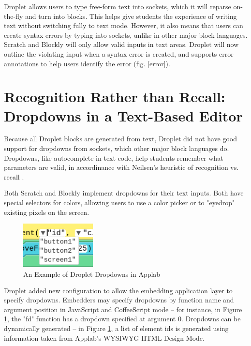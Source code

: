 \documentclass[conference]{IEEEtran}
\begin{document}
Droplet allows users to type free-form text into sockets, which it will reparse on-the-fly and turn into blocks. This helps give students the experience of writing text without switching fully to text mode. However, it also means that users can create syntax errors by typing into sockets, unlike in other major block languages. Scratch and Blockly will only allow valid inputs in text areas. Droplet will now outline the violating input when a syntax error is created, and supports error annotations to help users identify the error (fig. \ref{error}).

\section{Recognition Rather than Recall: Dropdowns in a Text-Based Editor}

Because all Droplet blocks are generated from text, Droplet did not have good support for dropdowns from sockets, which other major block languages do. Dropdowns, like autocomplete in text code, help students remember what parameters are valid, in accordinance with Neilsen's heuristic of recognition vs. recall \cite{Neilsen}.

Both Scratch and Blockly implement dropdowns for their text inputs. Both have special selectors for colors, allowing users to use a color picker or to "eyedrop" existing pixels on the screen.

\begin{figure}
\centering
\includegraphics[width=1.5in]{dropdowns.png}
\caption{An Example of Droplet Dropdowns in Applab}
\label{dropdowns}
\end{figure}

Droplet added new configuration to allow the embedding application layer to specify dropdowns. Embedders may specify dropdowns by function name and argument position in JavaScript and CoffeeScript mode -- for instance, in Figure \ref{dropdowns}, the "fd" function has a dropdown specified at argument 0. Dropdowns can be dynamically generated -- in Figure \ref{dropdowns}, a list of element ids is generated using information taken from Applab's WYSIWYG HTML Design Mode.
\end{document}

